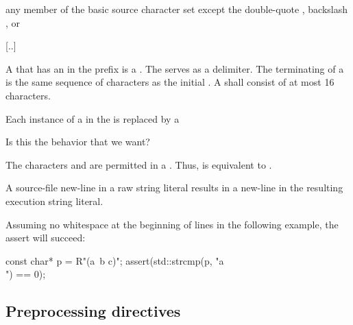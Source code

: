 \documentclass{wg21}
\begin{document}
\begin{bnf}
    \br
    \textnormal{any member of the basic source character set except the double-quote , backslash \terminal{\textbackslash}, or }
\end{bnf}

[..]

A  that has an 
%
in the prefix is a . The
 serves as a delimiter. The terminating
 of a  is the same sequence of
characters as the initial . A 
shall consist of at most 16 characters.

\begin{addedblock}
Each instance of a  in the  is replaced by a 
\end{addedblock}

\begin{quoteblock}
Is this the behavior that we want?
\end{quoteblock}

\pnum
\begin{note}
    The characters  and  are permitted in a
    . Thus,  is equivalent to
    .
\end{note}

\pnum
\begin{note}
    \begin{removedblock}
    A source-file new-line in a raw string literal results in a new-line in the
    resulting execution string literal.
   \end{removedblock}
 Assuming no
    whitespace at the beginning of lines in the following example, the assert will succeed:
    \begin{codeblock}
        const char* p = R"(a\
        b
        c)";
        assert(std::strcmp(p, "a\\\nb\nc") == 0);
    \end{codeblock}
\end{note}


\subsection{Preprocessing directives}%
\end{document}
